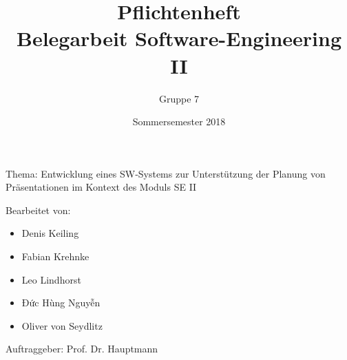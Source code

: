 \documentclass[a4paper]{scrartcl}
\title{Pflichtenheft \\ \large Belegarbeit Software-Engineering II}
\author{Gruppe 7}
\date{Sommersemester 2018}
\begin{document}
\maketitle

Thema: Entwicklung eines SW‐Systems zur Unterstützung der Planung von
Präsentationen im Kontext des Moduls SE II

Bearbeitet von:
\begin{itemize}
  \item Denis Keiling
  \item Fabian Krehnke
  \item Leo Lindhorst
  \item Đức Hùng Nguyễn
  \item Oliver von Seydlitz
\end{itemize}
Auftraggeber: Prof. Dr. Hauptmann

\tableofcontents

\listoffigures










\end{document}
